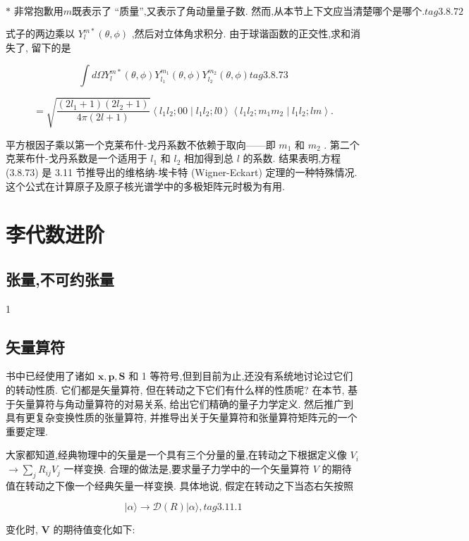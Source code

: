 $$
\text{* 非常抱歉用}m\text{既表示了 “质量”,又表示了角动量量子数. 然而,从本节上下文应当清楚哪个是哪个.} tag{3.8.72}
$$

式子的两边乘以 ${Y}_{l}^{m * }\left( {\theta ,\phi }\right)$ ,然后对立体角求积分. 由于球谐函数的正交性,求和消失了, 留下的是

$$
\int {d\Omega }{Y}_{l}^{m * }\left( {\theta ,\phi }\right) {Y}_{{l}_{1}}^{{m}_{1}}\left( {\theta ,\phi }\right) {Y}_{{l}_{2}}^{{m}_{2}}\left( {\theta ,\phi }\right) tag{3.8.73}
$$

$$
= \sqrt{\frac{\left( {2{l}_{1} + 1}\right) \left( {2{l}_{2} + 1}\right) }{{4\pi }\left( {{2l} + 1}\right) }}\left\langle {{l}_{1}{l}_{2};{00} \mid {l}_{1}{l}_{2};{l0}}\right\rangle \left\langle {{l}_{1}{l}_{2};{m}_{1}{m}_{2} \mid {l}_{1}{l}_{2};{lm}}\right\rangle .
$$

平方根因子乘以第一个克莱布什-戈丹系数不依赖于取向——即 ${m}_{1}$ 和 ${m}_{2}$ . 第二个克莱布什-戈丹系数是一个适用于 ${l}_{1}$ 和 ${l}_{2}$ 相加得到总 $l$ 的系数. 结果表明,方程 (3.8.73) 是 3.11 节推导出的维格纳-埃卡特 (Wigner-Eckart) 定理的一种特殊情况. 这个公式在计算原子及原子核光谱学中的多极矩阵元时极为有用.
\section{李代数进阶}
\subsection{张量,不可约张量}
1
\subsection{矢量算符}

书中已经使用了诸如 $\mathbf{x},\mathbf{p},\mathbf{S}$ 和 1 等符号,但到目前为止,还没有系统地讨论过它们的转动性质. 它们都是矢量算符, 但在转动之下它们有什么样的性质呢? 在本节, 基于矢量算符与角动量算符的对易关系, 给出它们精确的量子力学定义. 然后推广到具有更复杂变换性质的张量算符, 并推导出关于矢量算符和张量算符矩阵元的一个重要定理.

大家都知道,经典物理中的矢量是一个具有三个分量的量,在转动之下根据定义像 ${V}_{i}$ $\rightarrow \mathop{\sum }\limits_{j}{R}_{ij}{V}_{j}$ 一样变换. 合理的做法是,要求量子力学中的一个矢量算符 $V$ 的期待值在转动之下像一个经典矢量一样变换. 具体地说, 假定在转动之下当态右矢按照

$$
\left| {\alpha \rangle \rightarrow \mathcal{D}\left( R\right) }\right| \alpha \rangle , tag{3.11.1}
$$

变化时, $\mathbf{V}$ 的期待值变化如下:

